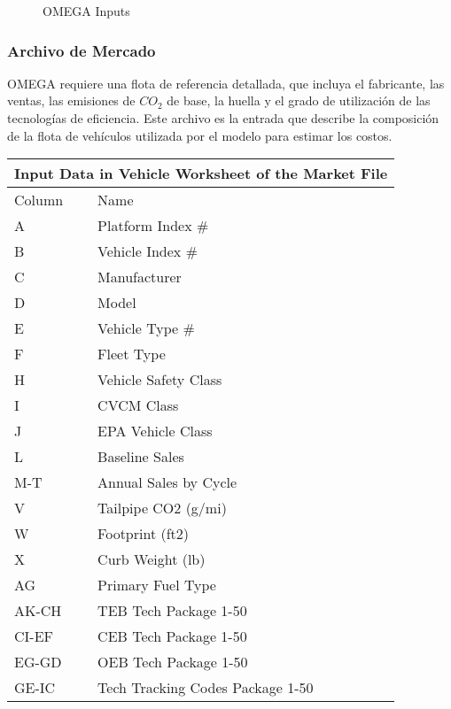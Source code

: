 \begin{figure}[htbp]
   \centering
   
    \caption{OMEGA Inputs}
    \label{fig:omegafiles}
\end{figure}

\subsubsection{Archivo de Mercado}

OMEGA requiere una flota de referencia detallada, que incluya el fabricante, las ventas, las emisiones de $CO_2$ de base, la huella y el grado de utilización de las tecnologías de eficiencia. Este archivo es la entrada que describe la composición de la flota de vehículos utilizada por el modelo
para estimar los costos.

\begin{center}
\begin{tabular}{ |p{2cm}||p{6cm}|}
 \hline
 \multicolumn{2}{|c|}{Input Data in Vehicle Worksheet of the Market File} \\
 \hline
 Column & Name\\
 \hline
    A & Platform Index \# \\
    B & Vehicle Index \#  \\
    C & Manufacturer     \\
    D & Model            \\
    E & Vehicle Type \#   \\
    F & Fleet Type       \\
    H & Vehicle Safety Class \\
    I & CVCM Class \\
    J & EPA Vehicle Class \\
    L & Baseline Sales \\
    M-T & Annual Sales by Cycle \\
    V & Tailpipe CO2 (g/mi) \\
    W & Footprint (ft2) \\
    X & Curb Weight (lb) \\
    AG & Primary Fuel Type \\
    AK-CH & TEB Tech Package 1-50 \\
    CI-EF & CEB Tech Package 1-50 \\
    EG-GD & OEB Tech Package 1-50 \\
    GE-IC & Tech Tracking Codes Package 1-50 \\
 \hline
\end{tabular}
\end{center}


